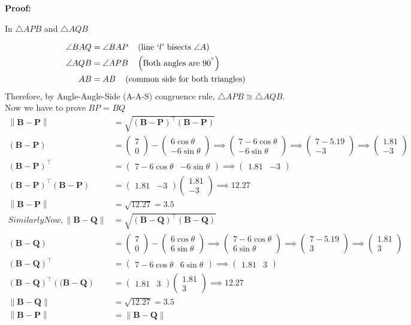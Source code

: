 \documentclass[10pt]{article}
\newcommand{\myvec}[1]{\ensuremath{\begin{pmatrix}#1\end{pmatrix}}}
\let\vec\mathbf
\providecommand{\brak}[1]{\ensuremath{\left(#1\right)}}
\providecommand{\norm}[1]{\left\lVert#1\right\rVert}
\begin{document}
\textbf{Proof:}
\begin{center}
In $\triangle{APB}$ and $\triangle{AQB}$
\end{center}
\begin{align}
\angle{BAQ} &= \angle{BAP} \quad \brak{\text{line \text{`$l$'} bisects $\angle{A}$}}\\
\angle{AQB} &= \angle{APB} \quad \brak{\text{Both angles are $90^{\degree}$}}\\
AB	 &= AB \quad \brak{\text{common side for both triangles}}
\end{align}
 Therefore, by Angle-Angle-Side (A-A-S) congruence rule, $\triangle{APB} \cong \triangle{AQB}$.\\
 Now we have to prove $BP$ = $BQ$
\begin{align}
\norm{\vec{B} - \vec{P}} & = \sqrt{\brak{\vec{B} - \vec{P}}^\top \brak{\vec{B} - \vec{P}}}\\
\brak{\vec{B} - \vec{P}} & = \myvec{7\\0} - \myvec{6\cos\theta\\-6\sin\theta} \implies \myvec{7-6\cos\theta\\-6\sin\theta} \implies \myvec{7-5.19\\ -3} \implies \myvec{1.81\\ -3}\\
\brak{\vec{B} - \vec{P}}^\top & = \myvec{7-6\cos\theta & -6\sin\theta} \implies \myvec{1.81 & -3}\\
\brak{\vec{B} - \vec{P}}^\top \brak{\vec{B} - \vec{P}} & = \myvec{1.81 & -3} \myvec{1.81\\ -3} \implies 12.27 \\
\norm{\vec{B} - \vec{P}} & = \sqrt{12.27} = 3.5\\
Similarly  Now,\norm{\vec{B} - \vec{Q}} & = \sqrt{\brak{\vec{B} - \vec{Q}}^\top \brak{\vec{B} - \vec{Q}}}\\
\brak{\vec{B} - \vec{Q}} & = \myvec{7\\0} - \myvec{6\cos\theta\\6\sin\theta} \implies \myvec{7-6\cos\theta\\6\sin\theta} \implies \myvec{7-5.19\\ 3} \implies \myvec{1.81\\ 3}\\
\brak{\vec{B} - \vec{Q}}^\top & = \myvec{7-6\cos\theta & 6\sin\theta} \implies \myvec{1.81 & 3}\\
\brak{\vec{B} - \vec{Q}}^\top \brak{(\vec{B} - \vec{Q}} & = \myvec{1.81 & 3} \myvec{1.81\\ 3} \implies 12.27 \\
\norm{\vec{B} - \vec{Q}} & = \sqrt{12.27} = 3.5\\
\norm{\vec{B} - \vec{P}} & = \norm{\vec{B} - \vec{Q}}
\end{align}
\end{document}
